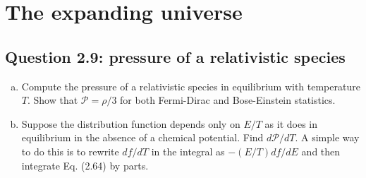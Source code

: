 \documentclass[11pt]{article}
\begin{document}
\newpage
\section{The expanding universe}
\subsection{Question 2.9: pressure of a relativistic species}
\begin{enumerate} [(a)]
    \item Compute the pressure of a relativistic species in equilibrium with temperature $T$. Show that $\mathcal{P} = \rho/3$ for both Fermi-Dirac and Bose-Einstein statistics. 
    \item Suppose the distribution function depends only on $E/T$ as it does in equilibrium in the absence of a chemical potential. Find $d\mathcal{P}/dT$. A simple way to do this is to rewrite $df/dT$ in the integral as $-(E/T)df/dE$ and then integrate Eq. (2.64) by parts. 
\end{enumerate}
\end{document}
